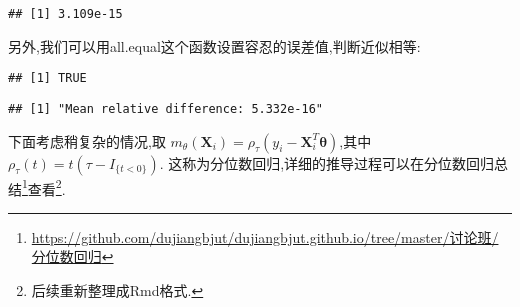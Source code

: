 \documentclass[]{ctexbook}
\newenvironment{Shaded}{\begin{snugshade}}{\end{snugshade}}
\newcommand{\DataTypeTok}[1]{\textcolor[rgb]{0.13,0.29,0.53}{#1}}
\newcommand{\DecValTok}[1]{\textcolor[rgb]{0.00,0.00,0.81}{#1}}
\newcommand{\FloatTok}[1]{\textcolor[rgb]{0.00,0.00,0.81}{#1}}
\newcommand{\KeywordTok}[1]{\textcolor[rgb]{0.13,0.29,0.53}{\textbf{#1}}}
\newcommand{\NormalTok}[1]{#1}
\newcommand{\OperatorTok}[1]{\textcolor[rgb]{0.81,0.36,0.00}{\textbf{#1}}}
\renewcommand{\href}[2]{#2\footnote{\url{#1}}}
\begin{document}
\begin{verbatim}
## [1] 3.109e-15
\end{verbatim}

另外,我们可以用all.equal这个函数设置容忍的误差值,判断近似相等:

\begin{Shaded}
\end{Shaded}

\begin{verbatim}
## [1] TRUE
\end{verbatim}

\begin{Shaded}
\end{Shaded}

\begin{verbatim}
## [1] "Mean relative difference: 5.332e-16"
\end{verbatim}

下面考虑稍复杂的情况,取
\(m_{\theta}\left(\boldsymbol{X}_{i}\right)=\rho_{\tau}\left(y_{i}-\boldsymbol{X}_{i}^{T} \boldsymbol{\theta}\right)\),其中
\(\rho_{\tau}(t)=t\left(\tau-I_{\{t<0\}}\right)\).
这称为分位数回归,详细的推导过程可以在\href{https://github.com/dujiangbjut/dujiangbjut.github.io/tree/master/讨论班/分位数回归}{分位数回归总结}查看\footnote{后续重新整理成Rmd格式.}.
\end{document}
